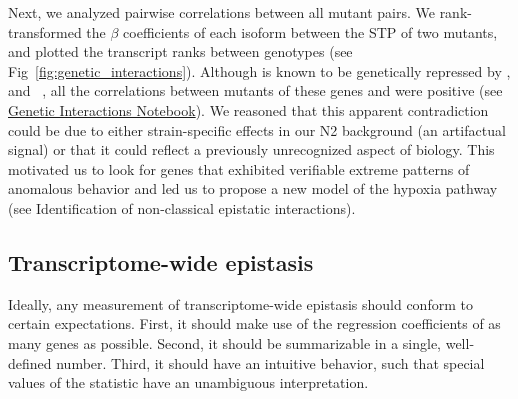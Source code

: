 Next, we analyzed pairwise correlations between all mutant pairs. We
rank-transformed the $\beta$ coefficients of each isoform between the STP of two
mutants, and plotted the transcript ranks between genotypes (see
Fig~\ref{fig:genetic_interactions}).
Although  is known to be genetically repressed by
,  and ~\citep{Epstein2001,Shen2006}, all the
correlations between mutants of these genes and \hif{} were positive (see
\href{https://wormlabcaltech.github.io/mprsq/analysis_notebooks/2_predict_interactions.html}
{Genetic Interactions Notebook}). We reasoned that this apparent contradiction
could be due to either strain-specific effects in our N2 background (an
artifactual signal) or that it could reflect a previously unrecognized aspect of
\hifp{} biology. This motivated us to look for genes that exhibited verifiable
extreme patterns of anomalous behavior and led us to propose a new model of the
hypoxia pathway (see Identification of non-classical epistatic interactions).

\subsection*{Transcriptome-wide epistasis}
Ideally, any measurement of transcriptome-wide epistasis should conform to
certain expectations. First, it should make use of the regression coefficients
of as many genes as possible. Second, it should be summarizable in a single,
well-defined number. Third, it should have an intuitive behavior, such that
special values of the statistic have an unambiguous interpretation.

